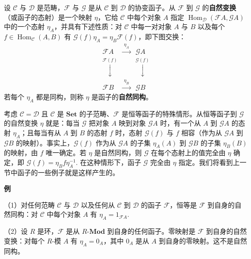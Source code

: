 \begin{definition}
设 \(\mathcal{C}\) 与 \(\mathcal{D}\) 是范畴，\(\mathcal{F}\) 与 \(\mathcal{G}\) 是从 \(\mathcal{C}\) 到 \(\mathcal{D}\) 的协变函子。从 \(\mathcal{F}\) 到 \(\mathcal{G}\) 的\textbf{自然变换}（或函子的态射）是一个映射 \(\eta\)，它给 \(\mathcal{C}\) 中每个对象 \(A\) 指定 \(\operatorname{Hom}_{\mathcal{D}}(\mathcal{F}A, \mathcal{G}A)\) 中的一个态射 \(\eta_A\)，并具有下述性质：对 \(\mathcal{C}\) 中每一对对象 \(A\) 与 \(B\) 以及每个 \(f \in \operatorname{Hom}_{\mathcal{C}}(A, B)\) 有 \(\mathcal{G}(f)\eta_A = \eta_B\mathcal{F}(f)\)，即下图交换：
\[
\renewcommand{\arraystretch}{1.6}
\begin{array}{ccc}
\mathcal{F}A & \xrightarrow{\ \eta_A\ } & \mathcal{G}A\\
\mathrel{\mathop{\downarrow}\limits^{\scriptstyle \mathcal{F}(f)}} & & \mathrel{\mathop{\downarrow}\limits^{\scriptstyle \mathcal{G}(f)}}\\
\mathcal{F}B & \xrightarrow{\ \eta_B\ } & \mathcal{G}B
\end{array}
\]
若每个 \(\eta_A\) 都是同构，则称 \(\eta\) 是函子的\textbf{自然同构}。
\end{definition}

考虑 \(\mathcal{C} = \mathcal{D}\) 且 \(\mathcal{C}\) 是 \(\mathbf{Set}\) 的子范畴、\(\mathcal{F}\) 是恒等函子的特殊情形。从恒等函子到 \(\mathcal{G}\) 的自然变换 \(\eta\) 就是：每当 \(\mathcal{G}\) 把对象 \(A\) 映到对象 \(\mathcal{G}A\) 时，有一个从 \(A\) 到 \(\mathcal{G}A\) 的态射 \(\eta_A\)；且每当有从 \(A\) 到 \(B\) 的态射 \(f\) 时，态射 \(\mathcal{G}(f)\) 与 \(f\) 相容（作为从 \(\mathcal{G}A\) 到 \(\mathcal{G}B\) 的映射）。事实上，\(\mathcal{G}(f)\) 作为从 \(\mathcal{G}A\) 的子集 \(\eta_A(A)\) 到 \(\mathcal{G}B\) 的子集 \(\eta_B(B)\) 的映射，由 \(f\) 唯一确定。若 \(\eta\) 是自然同构，则 \(\mathcal{G}\) 在每个态射上的值完全由 \(\eta\) 确定，即 \(\mathcal{G}(f) = \eta_Bf\eta_A^{-1}\). 在这种情形下，函子 \(\mathcal{G}\) 完全由 \(\eta\) 指定。我们将看到上一节中函子的一些例子就是这样产生的。

\noindent\textbf{例}

（1）对任何范畴 \(\mathcal{C}\) 与 \(\mathcal{D}\) 以及任何从 \(\mathcal{C}\) 到 \(\mathcal{D}\) 的函子 \(\mathcal{F}\)，恒等是 \(\mathcal{F}\) 到自身的自然同构：对 \(\mathcal{C}\) 中每个对象 \(A\) 有 \(\eta_A = 1_{\mathcal{F}A}\).

（2）设 \(R\) 是环，\(\mathcal{F}\) 是从 \(R\text{-}\mathbf{Mod}\) 到自身的任何函子。零映射是 \(\mathcal{F}\) 到自身的自然变换：对每个 \(R\)-模 \(A\) 有 \(\eta_A = 0_A\)，其中 \(0_A\) 是从 \(A\) 到自身的零映射。这不是自然同构。

